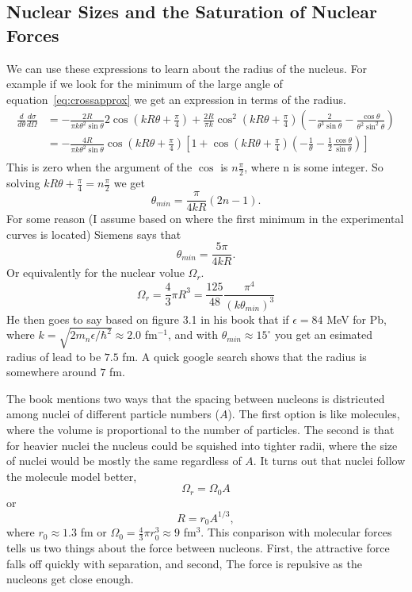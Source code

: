 \documentclass[12pt]{extarticle}
\begin{document}
\subsection*{Nuclear Sizes and the Saturation of Nuclear Forces}
We can use these expressions to learn about the radius of the nucleus. For example if we look for the minimum of the large angle of equation~\ref{eq:crossapprox} we get an expression in terms of the radius.
\begin{align}
   \frac{d}{d\theta}\frac{d\sigma}{d\Omega} &= -\frac{2R}{\pi k\theta^2\sin\theta}2\cos\left(kR\theta+\frac{\pi}{4}\right) + \frac{2R}{\pi k}\cos^2\left(kR\theta+\frac{\pi}{4}\right)\left(-\frac{2}{\theta^3\sin\theta}-\frac{\cos\theta}{\theta^2\sin^2\theta}\right) \\
   &= -\frac{4R}{\pi k\theta^2\sin\theta}\cos\left(kR\theta+\frac{\pi}{4}\right) \left[1 + \cos\left(kR\theta+\frac{\pi}{4}\right)\left(-\frac{1}{\theta}-\frac{1}{2}\frac{\cos\theta}{\sin\theta}\right)\right] \\
\end{align}
This is zero when the argument of the $\cos$ is $n\frac{\pi}{2}$, where n is some integer. So solving $kR\theta+\frac{\pi}{4} = n\frac{\pi}{2}$ we get
\begin{equation}
   \theta_{min} = \frac{\pi}{4kR}(2n-1).
\end{equation}
For some reason (I assume based on where the first minimum in the experimental curves is located) Siemens says that
\begin{equation}
   \boxed{ \theta_{min} = \frac{5\pi}{4kR} }.
\end{equation}
Or equivalently for the nuclear volue $\Omega_r$.
\begin{equation}
   \Omega_r = \frac{4}{3}\pi R^3 = \frac{125}{48}\frac{\pi^4}{(k\theta_{min})^3}
\end{equation}
He then goes to say based on figure 3.1 in his book that if $\epsilon = 84$ MeV for Pb, where $k = \sqrt{2m_n\epsilon/\hbar^2} \approx 2.0$ fm$^{-1}$, and with $\theta_{min} \approx 15^\circ$ you get an esimated radius of lead to be $7.5$ fm. A quick google search shows that the radius is somewhere around $7$ fm.

The book mentions two ways that the spacing between nucleons is districuted among nuclei of different particle numbers ($A$). The first option is like molecules, where the volume is proportional to the number of particles. The second is that for heavier nuclei the nucleus could be squished into tighter radii, where the size of nuclei would be mostly the same regardless of $A$. It turns out that nuclei follow the molecule model better,
\begin{equation}
   \Omega_r = \Omega_0 A
\end{equation}
or
\begin{equation}
   R = r_0 A^{1/3},
\end{equation}
where $r_0 \approx 1.3$ fm or $\Omega_0 = \frac{4}{3} \pi r_0^3 \approx 9$ fm$^3$.
This conparison with molecular forces tells us two things about the force between nucleons. First, the attractive force falls off quickly with separation, and second, The force is repulsive as the nucleons get close enough.
\end{document}
